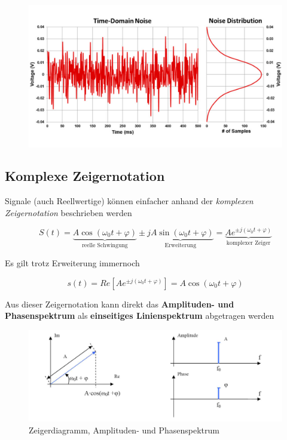 \documentclass[
  10pt,
  a4paper,
  german]{article}
\numberwithin{equation}{section}
\begin{document}
\begin{figure}[H]

{\centering \includegraphics{images/02_Rauschen.png}

}

\end{figure}

\hypertarget{komplexe-zeigernotation}{%
\subsection{Komplexe Zeigernotation}\label{komplexe-zeigernotation}}

Signale (auch Reellwertige) können einfacher anhand der \emph{komplexen
Zeigernotation} beschrieben werden

\[
S(t)=\underbrace{A\cos(\omega_0 t+\varphi)}_{\text{reelle Schwingung}}\pm\underbrace{jA\sin(\omega_0 t+\varphi)}_{\text{Erweiterung}}=\underbrace{Ae^{\pm j(\omega_0 t+\varphi)}}_{\text{komplexer Zeiger}}
\]

Es gilt trotz Erweiterung immernoch

\[
s(t)=Re\left[Ae^{\pm j(\omega_0 t+\varphi)}\right]=A\cos(\omega_0 t+\varphi)
\]

Aus dieser Zeigernotation kann direkt das \textbf{Amplituden- und
Phasenspektrum} als \textbf{einseitiges Linienspektrum} abgetragen
werden

\begin{figure}[H]

{\centering \includegraphics{images/02_AmpUndPhasenSpektrum.png}

}

\caption{Zeigerdiagramm, Amplituden- und Phasenspektrum}

\end{figure}
\end{document}
